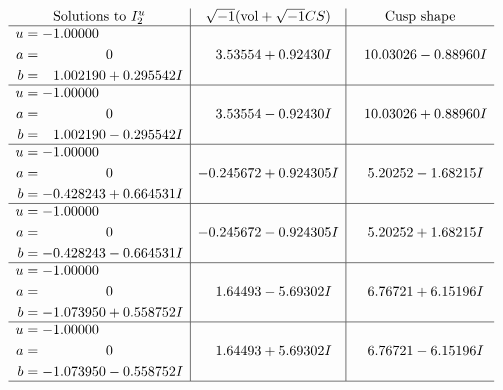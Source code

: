 \documentclass[1p]{elsarticle_modified}
\theoremstyle{definition}
\newcommand{\I}{\sqrt{-1}}
\begin{document}
$$\begin{array}{c|c|c}  
\text{Solutions to }I^u_{2}& \I (\text{vol} + \sqrt{-1}CS) & \text{Cusp shape}\\
 \hline 
\begin{aligned}
u &= -1.00000\phantom{ +0.000000I} \\
a &= \phantom{-0.000000 } 0 \\
b &= \phantom{-}1.002190 + 0.295542 I\end{aligned}
 & \phantom{-}3.53554 + 0.92430 I & \phantom{-}10.03026 - 0.88960 I \\ \hline\begin{aligned}
u &= -1.00000\phantom{ +0.000000I} \\
a &= \phantom{-0.000000 } 0 \\
b &= \phantom{-}1.002190 - 0.295542 I\end{aligned}
 & \phantom{-}3.53554 - 0.92430 I & \phantom{-}10.03026 + 0.88960 I \\ \hline\begin{aligned}
u &= -1.00000\phantom{ +0.000000I} \\
a &= \phantom{-0.000000 } 0 \\
b &= -0.428243 + 0.664531 I\end{aligned}
 & -0.245672 + 0.924305 I & \phantom{-}5.20252 - 1.68215 I \\ \hline\begin{aligned}
u &= -1.00000\phantom{ +0.000000I} \\
a &= \phantom{-0.000000 } 0 \\
b &= -0.428243 - 0.664531 I\end{aligned}
 & -0.245672 - 0.924305 I & \phantom{-}5.20252 + 1.68215 I \\ \hline\begin{aligned}
u &= -1.00000\phantom{ +0.000000I} \\
a &= \phantom{-0.000000 } 0 \\
b &= -1.073950 + 0.558752 I\end{aligned}
 & \phantom{-}1.64493 - 5.69302 I & \phantom{-}6.76721 + 6.15196 I \\ \hline\begin{aligned}
u &= -1.00000\phantom{ +0.000000I} \\
a &= \phantom{-0.000000 } 0 \\
b &= -1.073950 - 0.558752 I\end{aligned}
 & \phantom{-}1.64493 + 5.69302 I & \phantom{-}6.76721 - 6.15196 I\\
 \hline 
 \end{array}$$\newpage
\end{document}
